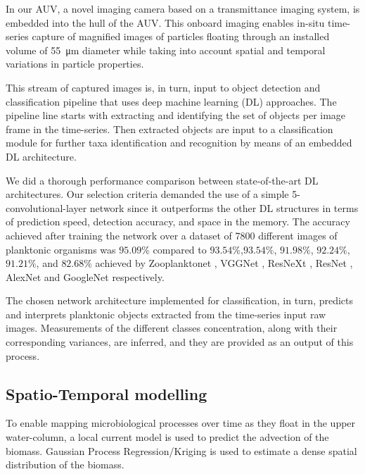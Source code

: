 \documentclass[conference]{IEEEtran}
\begin{document}
In our AUV, a novel imaging camera \cite{Davies2017a} based on a
transmittance imaging system, is embedded into the hull of the
AUV. This onboard imaging enables in-situ time-series capture of
magnified images of particles floating through an installed volume of
\SI{55}{\micro\meter} diameter while taking into account spatial and
temporal variations in particle properties.

This stream of captured images is, in turn, input to object detection
and classification pipeline that uses deep machine learning (DL)
approaches. The pipeline line starts with extracting and identifying
the set of objects per image frame in the time-series. Then extracted
objects are input to a classification module for further taxa
identification and recognition by means of an embedded DL
architecture.

We did a thorough performance comparison between state-of-the-art DL
architectures. Our selection criteria demanded the use of a simple
5-convolutional-layer network since it outperforms the other DL
structures in terms of prediction speed, detection accuracy, and space
in the memory. The accuracy achieved after training the network over a
dataset of 7800 different images of planktonic organisms was $95.09\%$
compared to $93.54\%$,$93.54\%$, $91.98\%$, $92.24\%$, $91.21\%$, and
$82.68\%$ achieved by Zooplanktonet \cite{dai2016zooplanktonet},
VGGNet \cite{simonyan2014very}, ResNeXt \cite{xie2017aggregated},
ResNet \cite{he2016deep}, AlexNet \cite{krizhevsky2012imagenet} and
GoogleNet \cite{szegedy2015going} respectively.

The chosen network architecture implemented for classification, in
turn, predicts and interprets planktonic objects extracted from the
time-series input raw images. Measurements of the different classes
concentration, along with their corresponding variances, are inferred,
and they are provided as an output of this process.

\subsection{Spatio-Temporal modelling}
To enable mapping microbiological processes over time as they float in
the upper water-column, a local current model is used to predict the
advection of the biomass. Gaussian Process Regression/Kriging is
used to estimate a dense spatial distribution of the biomass.
\end{document}
